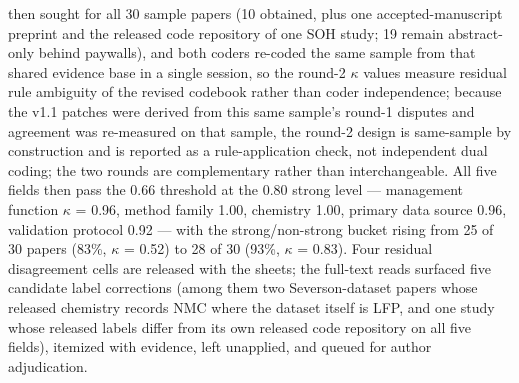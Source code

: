 \documentclass[journal]{IEEEtran}
\begin{document}
then sought for all 30 sample papers (10 obtained, plus one accepted-manuscript preprint and the released code repository of one SOH study; 19 remain abstract-only behind paywalls), and both coders re-coded the same sample from that shared evidence base in a single session, so the round-2 $\kappa$ values measure residual rule ambiguity of the revised codebook rather than coder independence; because the v1.1 patches were derived from this same sample's round-1 disputes and agreement was re-measured on that sample, the round-2 design is same-sample by construction and is reported as a rule-application check, not independent dual coding; the two rounds are complementary rather than interchangeable. All five fields then pass the 0.66 threshold at the 0.80 strong level --- management function $\kappa$ = 0.96, method family 1.00, chemistry 1.00, primary data source 0.96, validation protocol 0.92 --- with the strong/non-strong bucket rising from 25 of 30 papers (83\%, $\kappa$ = 0.52) to 28 of 30 (93\%, $\kappa$ = 0.83). Four residual disagreement cells are released with the sheets; the full-text reads surfaced five candidate label corrections (among them two Severson-dataset papers whose released chemistry records NMC where the dataset itself is LFP, and one study whose released labels differ from its own released code repository on all five fields), itemized with evidence, left unapplied, and queued for author adjudication.
\end{document}
